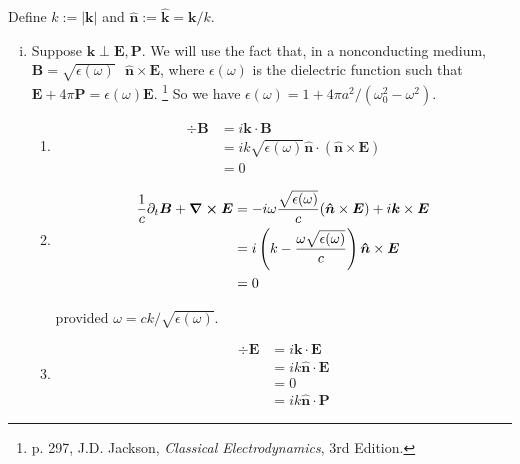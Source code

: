 \documentclass[]{article}
\begin{document}
\begin{enumerate}[a)]
\hfill

Define $k := |\bm{k}|$ and $\bm{\hat{n}} := \bm{\hat{k}} =  \bm{k}/k$. \\

\begin{enumerate}[(i)]

\item Suppose $\bm{k} \perp \bm{E}, \bm{P}$. We will use the fact that, in a nonconducting medium, $\bm{B} = \sqrt{\epsilon(\omega)} \text{ }\bm{\hat{n}} \times \bm{E}$, where $\epsilon(\omega)$ is the dielectric function such that $\bm{E} + 4\pi \bm{P} = \epsilon(\omega) \bm{E}$. \footnote{ p. 297, J.D. Jackson, {\it Classical Electrodynamics}, 3rd Edition. } So we have $\epsilon(\omega) = 1 + 4\pi a^2 / (\omega_0^2 - \omega^2)$. \\ 


\begin{enumerate}[(M1)]

\item

\begin{equation}
\begin{split}
\div \bm{B} & = i\bm{k} \cdot \bm{B} \\
& = ik  \sqrt{ \epsilon(\omega) }\bm{\hat{n}} \cdot ( \bm{\hat{n}} \times \bm{E} ) \\
& = 0
\end{split}
\end{equation}

\item 

\begin{equation}
\begin{split}
\frac{1}{c} \partial_t \bm{B} + \curl \bm{E} & = -i \omega \frac{\sqrt{\epsilon(\omega)}}{c}(\bm{\hat{n}} \times \bm{E} ) + i\bm{k} \times \bm{E} \\
& = i \left(  k - \frac{\omega \sqrt{ \epsilon(\omega) }}{c}   \right) \bm{\hat{n}} \times \bm{E} \\
& = 0 \\
\end{split}
\end{equation}

provided $\omega = ck /\sqrt{ \epsilon(\omega)  } $. \\

\item 

\begin{equation}
\begin{split}
\div \bm{E} & = i\bm{k} \cdot \bm{E} \\
& = ik \bm{\hat{n}} \cdot \bm{E} \\
& = 0 \\
& =  ik \bm{\hat{n}} \cdot \bm{P}
\end{split}
\end{equation}


\end{enumerate}
\end{enumerate}
\end{enumerate}
\end{document}
